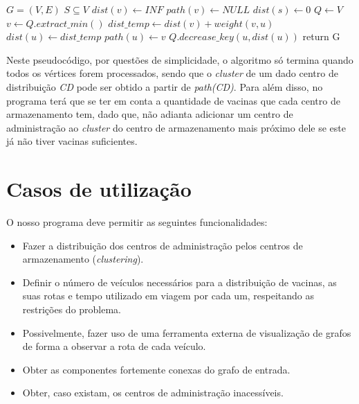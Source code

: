 \documentclass[12pt,a4paper]{report}
\begin{document}
		\begin{center}
			\begin{algorithmic}[1]
				\State $ G = (V, E) $
				\State $ S \subseteq V $
				\newline
					\State $dist(v) \leftarrow INF$
					\State $path(v) \leftarrow NULL$
				\EndFor
					\State $dist(s) \leftarrow 0$
				\EndFor
				\State $Q \leftarrow V$
					\State $v \leftarrow Q.extract\_min()$
						\State $dist\_temp \leftarrow dist(v) + weight(v,u)$
							\State $dist(u) \leftarrow dist\_temp$
							\State $path(u) \leftarrow v$
							\State $Q.decrease\_key(u,dist(u))$
						\EndIf
					\EndFor
				\EndWhile
				\State return G
				\EndFunction
			\end{algorithmic}
		\end{center}


		Neste pseudocódigo, por questões de simplicidade, o algoritmo só termina quando todos os vértices forem processados, sendo que o \textit{cluster} de um dado centro de distribuição \textit{CD} pode ser obtido a partir de \textit{path(CD)}. Para além disso, no programa terá que se ter em conta a quantidade de vacinas que cada centro de armazenamento tem, dado que, não adianta adicionar um centro de administração ao \textit{cluster} do centro de armazenamento mais próximo dele se este já não tiver vacinas suficientes.
	

\chapter{Casos de utilização}
O nosso programa deve permitir as seguintes funcionalidades:
	\begin{itemize}
		\item Fazer a distribuição dos centros de administração pelos centros de armazenamento (\textit{clustering}).
		\item Definir o número de veículos necessários para a distribuição de vacinas, as suas rotas e tempo utilizado em viagem por cada um, respeitando as restrições do problema.
		\item Possivelmente, fazer uso de uma ferramenta externa de visualização de grafos de forma a observar a rota de cada veículo.
		\item Obter as componentes fortemente conexas do grafo de entrada.
		\item Obter, caso existam, os centros de administração inacessíveis.
	\end{itemize}
\end{document}
